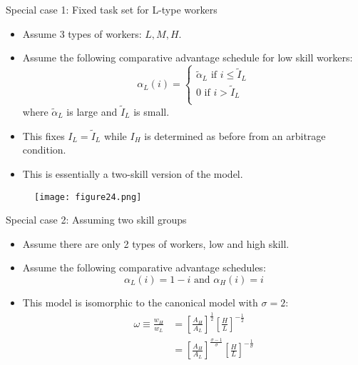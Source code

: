 \documentclass[notes=show]{beamer}
\begin{document}
\begin{frame}{Special case 1: Fixed task set for L-type workers}
\begin{itemize}
\item Assume 3 types of workers: $L,M,H$. \medskip
\item Assume the following comparative advantage schedule for low skill workers:
\[
\alpha_{L}(i) = 
\begin{cases}
\tilde{\alpha}_{L} \text{ if } i \leq \tilde{I}_{L} \\
0 \text{ if } i > \tilde{I}_{L} \\
\end{cases}
\]
where $\tilde{\alpha}_{L} $ is large and $ \tilde{I}_{L}$ is small. \medskip
\item This fixes  $I_{L} = \tilde{I}_{L}$ while $I_{H}$ is determined as before from an arbitrage condition. \medskip
\item This is essentially a two-skill version of the model.  
\end{itemize}
\end{frame}

\newpage
\begin{center}
\begin{figure}
\texttt{[image: figure24.png]}
\end{figure} 
\end{center}
\newpage

\begin{frame}{Special case 2: Assuming two skill groups}
\begin{itemize}
\item Assume there are only 2 types of workers, low and high skill. \medskip
\item Assume the following comparative advantage schedules:
\[
\alpha_{L}(i) = 1-i \text{ and } \alpha_{H}(i)=i
\]
\item This model is isomorphic to the canonical model with $\sigma =2$:
\begin{align*}
\omega \equiv \frac{w_{H}}{w_{L}} & = \left[ \frac{A_{H}}{A_{L}} \right] ^{ \frac{ 1}{2}}  \left[ \frac{H}{L} \right] ^ {-\frac{1}{ 2}} \tag{5} \label{eq5} \\ 
& = \left[ \frac{A_{H}}{A_{L}} \right] ^{ \frac{ \sigma -1}{ \sigma}}  \left[ \frac{H}{L} \right] ^ {-\frac{1}{ \sigma}}  
\end{align*}
\end{itemize}
\end{frame}
\end{document}
